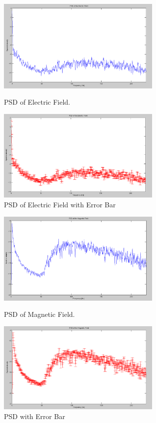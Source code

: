 \documentclass{article}
\begin{document}
\begin{figure}[htb!]
\begin{minipage}[c]{0.5\linewidth}
\centering
\includegraphics[width=8cm]{Figures/PSD_electric.png}
\caption{PSD of Electric Field.}
\label{fig:PSD_electric}
\end{minipage}
\hspace{0.1cm}
\begin{minipage}[c]{0.5\linewidth}
\centering
\includegraphics[width=8cm]{Figures/PSD_electric_error.png}
\caption{PSD of Electric Field with Error Bar}
\label{fig:PSD_electric_error}
\end{minipage}
\end{figure}

\begin{figure}[htb!]
\begin{minipage}[c]{0.5\linewidth}
\centering
\includegraphics[width=8cm]{Figures/PSD_magnetic.png}
\caption{PSD of Magnetic Field.}
\label{fig:PSD_magnetic}
\end{minipage}
\hspace{0.1cm}
\begin{minipage}[c]{0.5\linewidth}
\centering
\includegraphics[width=8cm]{Figures/PSD_magnetic_error.png}
\caption{PSD with Error Bar}
\label{fig:PSD_magnetic_error}
\end{minipage}
\end{figure}
\end{document}
